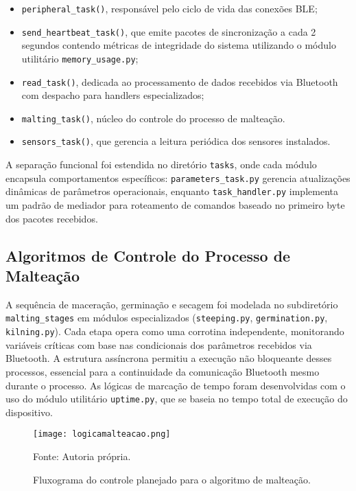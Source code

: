 \begin{itemize}

\item \texttt{peripheral\_task()}, responsável pelo ciclo de vida das conexões BLE;
\item \texttt{send\_heartbeat\_task()}, que emite pacotes de sincronização a cada 2 segundos contendo métricas de integridade do sistema utilizando o módulo utilitário \texttt{memory\_usage.py};
\item \texttt{read\_task()}, dedicada ao processamento de dados recebidos via Bluetooth com despacho para handlers especializados;
\item \texttt{malting\_task()}, núcleo do controle do processo de malteação.
\item \texttt{sensors\_task()}, que gerencia a leitura periódica dos sensores instalados.


\end{itemize}

A separação funcional foi estendida no diretório \texttt{tasks}, onde cada módulo encapsula comportamentos específicos: \texttt{parameters\_task.py} gerencia atualizações dinâmicas de parâmetros operacionais, enquanto \texttt{task\_handler.py} implementa um padrão de mediador para roteamento de comandos baseado no primeiro byte dos pacotes recebidos.

\subsection{Algoritmos de Controle do Processo de Malteação}
A sequência de maceração, germinação e secagem foi modelada no subdiretório \texttt{malting\_stages} em módulos especializados (\texttt{steeping.py}, \texttt{germination.py}, \texttt{kilning.py}). Cada etapa opera como uma corrotina independente, monitorando variáveis críticas com base nas condicionais dos parâmetros recebidos via Bluetooth. A estrutura assíncrona permitiu a execução não bloqueante desses processos, essencial para a continuidade da comunicação Bluetooth mesmo durante o processo. As lógicas de marcação de tempo foram desenvolvidas com o uso do módulo utilitário \texttt{uptime.py}, que se baseia no tempo total de execução do dispositivo.

\begin{figure}[ht]
    \centering
    \caption{Fluxograma do controle planejado para o algoritmo de malteação.}
    \label{fig:logicamalteacao}
    \texttt{[image: logicamalteacao.png]}

    {\centering\footnotesize Fonte: Autoria própria.\par}
\end{figure}



